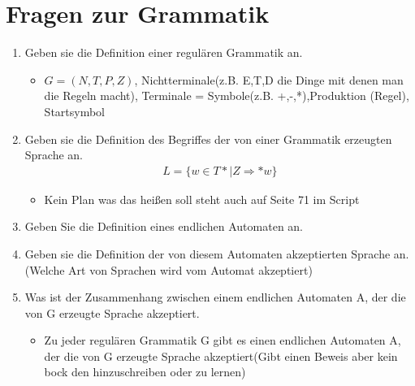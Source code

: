 \documentclass[
  ngerman
  ,12pt
  ,pdftex
]{article}
\begin{document}
\section{Fragen zur Grammatik}
\begin{enumerate}
  \item Geben sie die Definition einer regulären Grammatik an.
  \begin{itemize}
    \item [] $G=(N,T,P,Z)$, Nichtterminale(z.B. E,T,D die Dinge mit denen man die Regeln macht), Terminale = Symbole(z.B. +,-,*),Produktion (Regel), Startsymbol
  \end{itemize}
  \item Geben sie die Definition des Begriffes der von einer Grammatik erzeugten Sprache an.
  \begin{align*}
    L=\{w\in T* | Z \Longrightarrow*w\}
  \end{align*}
  \begin{itemize}
    \item Kein Plan was das heißen soll steht auch auf Seite 71 im Script
  \end{itemize}
  \item Geben Sie die Definition eines endlichen Automaten an.
  \item Geben sie die Definition der von diesem Automaten akzeptierten Sprache an.(Welche Art von Sprachen wird vom Automat akzeptiert)
  \item Was ist der Zusammenhang zwischen einem endlichen Automaten A, der die von G erzeugte Sprache akzeptiert.
  \begin{itemize}
    \item Zu jeder regulären Grammatik G gibt es einen endlichen Automaten A, der die von G erzeugte Sprache akzeptiert(Gibt einen Beweis aber kein bock den hinzuschreiben oder zu lernen)


\end{itemize}
\end{enumerate}
\end{document}
